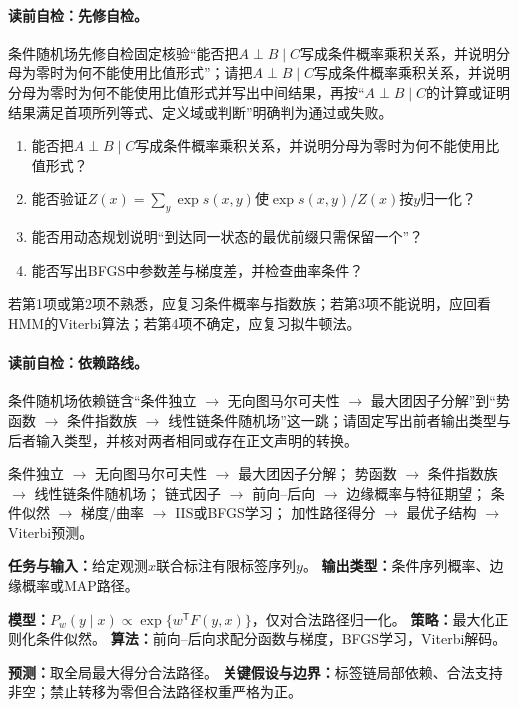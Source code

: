 \label{struct:V3-C06-CH03}
\paragraph{读前自检：先修自检。}条件随机场先修自检固定核验“能否把$A\perp B\mid C$写成条件概率乘积关系，并说明分母为零时为何不能使用比值形式”；请把$A\perp B\mid C$写成条件概率乘积关系，并说明分母为零时为何不能使用比值形式并写出中间结果，再按“$A\perp B\mid C$的计算或证明结果满足首项所列等式、定义域或判断”明确判为通过或失败。\par

\begin{precheckbox}
\begin{enumerate}[leftmargin=2.2em]
  \item 能否把$A\perp B\mid C$写成条件概率乘积关系，并说明分母为零时为何不能使用比值形式？
  \item 能否验证$Z(x)=\sum_y\exp s(x,y)$使$\exp s(x,y)/Z(x)$按$y$归一化？
  \item 能否用动态规划说明“到达同一状态的最优前缀只需保留一个”？
  \item 能否写出BFGS中参数差与梯度差，并检查曲率条件？
\end{enumerate}
若第1项或第2项不熟悉，应复习条件概率与指数族；若第3项不能说明，应回看HMM的Viterbi算法；若第4项不确定，应复习拟牛顿法。
\end{precheckbox}

\label{struct:V3-C06-CH04}
\paragraph{读前自检：依赖路线。}条件随机场依赖链含“条件独立 $\to$ 无向图马尔可夫性 $\to$ 最大团因子分解”到“势函数 $\to$ 条件指数族 $\to$ 线性链条件随机场”这一跳；请固定写出前者输出类型与后者输入类型，并核对两者相同或存在正文声明的转换。\par

\begin{dependencybox}
条件独立 $\to$ 无向图马尔可夫性 $\to$ 最大团因子分解；
势函数 $\to$ 条件指数族 $\to$ 线性链条件随机场；
链式因子 $\to$ 前向--后向 $\to$ 边缘概率与特征期望；
条件似然 $\to$ 梯度/曲率 $\to$ IIS或BFGS学习；
加性路径得分 $\to$ 最优子结构 $\to$ Viterbi预测。
\end{dependencybox}

\begin{keypointbox}[title=模型认识卡：条件随机场]
\textbf{任务与输入：}给定观测$x$联合标注有限标签序列$y$。\quad
\textbf{输出类型：}条件序列概率、边缘概率或MAP路径。\par
\textbf{模型：}$P_w(y\mid x)\propto\exp\{w^{\mathsf T}F(y,x)\}$，仅对合法路径归一化。\quad
\textbf{策略：}最大化正则化条件似然。\quad
\textbf{算法：}前向--后向求配分函数与梯度，BFGS学习，Viterbi解码。\par
\textbf{预测：}取全局最大得分合法路径。\quad
\textbf{关键假设与边界：}标签链局部依赖、合法支持非空；禁止转移为零但合法路径权重严格为正。
\end{keypointbox}

